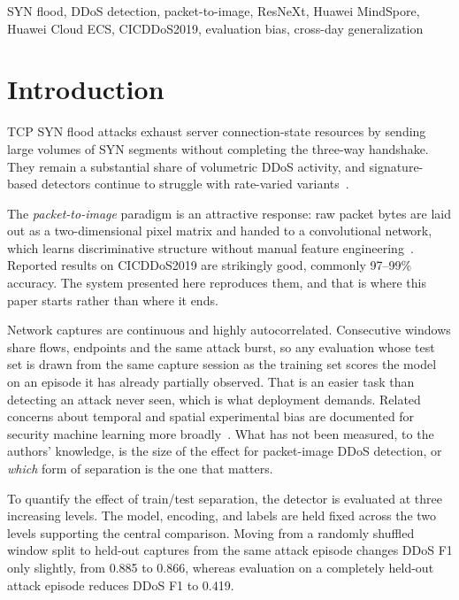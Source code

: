\documentclass[conference]{IEEEtran} \IEEEoverridecommandlockouts
\begin{document}
\begin{IEEEkeywords}
SYN flood, DDoS detection, packet-to-image, ResNeXt, Huawei MindSpore,
Huawei Cloud ECS, CICDDoS2019, evaluation bias, cross-day generalization
\end{IEEEkeywords}

\section{Introduction}
\label{sec:intro}

TCP SYN flood attacks exhaust server connection-state resources by sending
large volumes of SYN segments without completing the three-way handshake. They
remain a substantial share of volumetric DDoS activity, and signature-based
detectors continue to struggle with rate-varied
variants~\cite{sharafaldin2019ddos}.

The \emph{packet-to-image} paradigm is an attractive response: raw packet bytes
are laid out as a two-dimensional pixel matrix and handed to a convolutional
network, which learns discriminative structure without manual feature
engineering~\cite{lotfollahi2020deep,bazzi2024resnet,shapira2019flowpic}.
Reported results on CICDDoS2019 are strikingly good, commonly 97--99\%
accuracy. The system presented here reproduces them, and that is where this
paper starts rather than where it ends.

Network captures are continuous and highly autocorrelated. Consecutive windows
share flows, endpoints and the same attack burst, so any evaluation whose test
set is drawn from the same capture session as the training set scores the model
on an episode it has already partially observed. That is an easier task than
detecting an attack never seen, which is what deployment demands. Related concerns about temporal and spatial
experimental bias are documented for security machine learning more
broadly~\cite{arp2022dos,pendlebury2019tesseract}. What has not been measured,
to the authors' knowledge, is the size of the effect for packet-image DDoS
detection, or \emph{which} form of separation is the one that matters.

To quantify the effect of train/test separation, the detector is evaluated at
three increasing levels. The model, encoding, and labels are held fixed across
the two levels supporting the central comparison. Moving from a randomly
shuffled window split to held-out captures from the same attack episode changes
DDoS F1 only slightly, from 0.885 to 0.866, whereas evaluation on a completely
held-out attack episode reduces DDoS F1 to 0.419.
\end{document}
